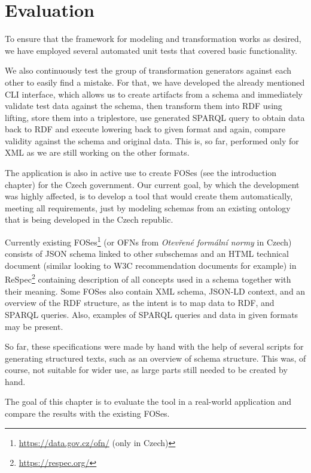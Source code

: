 \chapter{Evaluation}
\label{chapters:evaluation}

To ensure that the framework for modeling and transformation works as desired, we have employed several automated unit tests that covered basic functionality.

We also continuously test the group of transformation generators against each other to easily find a mistake. For that, we have developed the already mentioned CLI interface, which allows us to create artifacts from a schema and immediately validate test data against the schema, then transform them into RDF using lifting, store them into a triplestore, use generated SPARQL query to obtain data back to RDF and execute lowering back to given format and again, compare validity against the schema and original data. This is, so far, performed only for XML as we are still working on the other formats.

\medskip

The application is also in active use to create FOSes (see the introduction chapter) for the Czech government. Our current goal, by which the development was highly affected, is to develop a tool that would create them automatically, meeting all requirements, just by modeling schemas from an existing ontology that is being developed \cite{kvremen2019improving} in the Czech republic.

Currently existing FOSes\footnote{\url{https://data.gov.cz/ofn/} (only in Czech)} (or OFNs from \textit{Otevřené formální normy} in Czech) consists of JSON schema linked to other subschemas and an HTML technical document (similar looking to W3C recommendation documents for example) in ReSpec\footnote{\url{https://respec.org/}} containing description of all concepts used in a schema together with their meaning. Some FOSes also contain XML schema, JSON-LD context, and an overview of the RDF structure, as the intent is to map data to RDF, and SPARQL queries. Also, examples of SPARQL queries and data in given formats may be present.

So far, these specifications were made by hand with the help of several scripts for generating structured texts, such as an overview of schema structure. This was, of course, not suitable for wider use, as large parts still needed to be created by hand.

The goal of this chapter is to evaluate the tool in a real-world application and compare the results with the existing FOSes.


